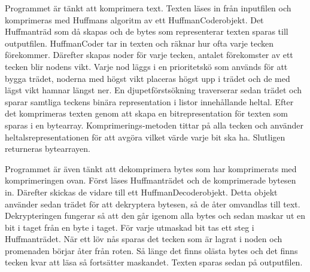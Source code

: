 \documentclass[a5paper,10pt,oneside]{article}
\begin{document}
Programmet är tänkt att komprimera text. Texten läses in från inputfilen och komprimeras med Huffmans algoritm av ett HuffmanCoderobjekt. Det Huffmanträd som då skapas och de bytes som representerar texten sparas till outputfilen. HuffmanCoder tar in texten och räknar hur ofta varje tecken förekommer. Därefter skapas noder för varje tecken, antalet förekomster av ett tecken blir nodens vikt. Varje nod läggs i en prioritetskö som används för att bygga trädet, noderna med högst vikt placeras högst upp i trädet och de med lägst vikt hamnar längst ner.
En djupetförstsökning traverserar sedan trädet och sparar samtliga teckens binära representation i listor innehållande heltal. Efter det komprimeras texten genom att skapa en bitrepresentation för texten som sparas i en bytearray. Komprimerings-metoden tittar på alla tecken och använder heltalsrepresentationen för att avgöra vilket värde varje bit ska ha. Slutligen returneras bytearrayen.

Programmet är även tänkt att dekomprimera bytes som har komprimerats med komprimeringen ovan. Först läses Huffmanträdet och de komprimerade bytesen in. Därefter skickas de vidare till ett HuffmanDecoderobjekt. Detta objekt använder sedan trädet för att dekryptera bytesen, så de åter omvandlas till text. Dekrypteringen fungerar så att den går igenom alla bytes och sedan maskar ut en bit i taget från en byte i taget. För varje utmaskad bit tas ett steg i Huffmanträdet. När ett löv nås sparas det tecken som är lagrat i noden och promenaden börjar åter från roten. Så länge det finns olästa bytes och det finns tecken kvar att läsa så fortsätter maskandet. Texten sparas sedan på outputfilen.
\end{document}
